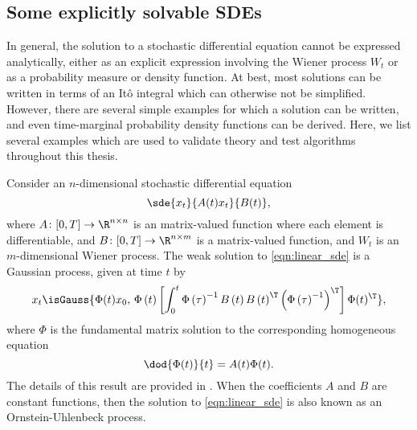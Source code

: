 
\subsection{Some explicitly solvable SDEs}\label{sec:back_sde_solutions}
In general, the solution to a stochastic differential equation cannot be expressed analytically, either as an explicit expression involving the Wiener process \(W_t\) or as a probability measure or density function.
At best, most solutions can be written in terms of an It\^o integral which can otherwise not be simplified.
However, there are several simple examples for which a solution can be written, and even time-marginal probability density functions can be derived.
Here, we list several examples which are used to validate theory and test algorithms throughout this thesis.

\begin{example}
	Consider an \(n\)-dimensional stochastic differential equation
	\begin{equation}
		\sde{x_t}{A(t)x_t}{B(t)},
		\label{eqn:linear_sde}
	\end{equation}
	where \(A\colon [0,T] \to \R^{n\times n}\) is an matrix-valued function where each element is differentiable, and \(B\colon [0,T] \to \R^{n\times m}\) is a matrix-valued function, and \(W_t\) is an \(m\)-dimensional Wiener process.
	The weak solution to \cref{eqn:linear_sde} is a Gaussian process, given at time \(t\) by
	\[
		x_t \isGauss{\Phi(t) x_0, \, \Phi\left(t\right)\left[\int_0^t{\Phi\left(\tau\right)^{-1}B\left(t\right)B\left(t\right)^{\T}\left(\Phi\left(\tau\right)^{-1}\right)^{\T}}\right]\Phi(t)^{\T}},
	\]
	where \(\Phi\) is the fundamental matrix solution to the corresponding homogeneous equation
	\[
		\dod{\Phi(t)}{t} = A(t)\Phi(t).
	\]
	The details of this result are provided in .
	When the coefficients \(A\) and \(B\) are constant functions, then the solution to \cref{eqn:linear_sde} is also known as an Ornstein-Uhlenbeck process.

\end{example}

